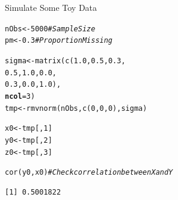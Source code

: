 \documentclass{beamer}\usepackage[]{graphicx}\usepackage[]{color}
\makeatletter
\newcommand{\hlnum}[1]{\textcolor[rgb]{0.69,0.494,0}{#1}}%
\newcommand{\hlcom}[1]{\textcolor[rgb]{0.514,0.506,0.514}{\textit{#1}}}%
\newcommand{\hlstd}[1]{\textcolor[rgb]{0,0,0}{#1}}%
\newcommand{\hlkwb}[1]{\textcolor[rgb]{0,0.341,0.682}{#1}}%
\newcommand{\hlkwc}[1]{\textcolor[rgb]{0,0,0}{\textbf{#1}}}%
\newcommand{\hlkwd}[1]{\textcolor[rgb]{0.004,0.004,0.506}{#1}}%
\newenvironment{kframe}{%
 \def\at@end@of@kframe{}%
 \ifinner\ifhmode%
  \def\at@end@of@kframe{\end{minipage}}%
  \begin{minipage}{\columnwidth}%
 \fi\fi%
 \def\FrameCommand##1{\hskip\@totalleftmargin \hskip-\fboxsep
 \colorbox{shadecolor}{##1}\hskip-\fboxsep
     \hskip-\linewidth \hskip-\@totalleftmargin \hskip\columnwidth}%
 \MakeFramed {\advance\hsize-\width
   \@totalleftmargin\z@ \linewidth\hsize
   \@setminipage}}%
 {\par\unskip\endMakeFramed%
 \at@end@of@kframe}
\newenvironment{knitrout}{}{} %
\makeatother
\begin{document}
\begin{frame}[fragile]{Simulate Some Toy Data}
  
\begin{knitrout}\footnotesize
{}\color{fgcolor}\begin{kframe}
\begin{alltt}
\hlstd{nObs} \hlkwb{<-} \hlnum{5000} \hlcom{# Sample Size}
\hlstd{pm}   \hlkwb{<-} \hlnum{0.3}  \hlcom{# Proportion Missing}

\hlstd{sigma} \hlkwb{<-} \hlkwd{matrix}\hlstd{(}\hlkwd{c}\hlstd{(}\hlnum{1.0}\hlstd{,} \hlnum{0.5}\hlstd{,} \hlnum{0.3}\hlstd{,}
                  \hlnum{0.5}\hlstd{,} \hlnum{1.0}\hlstd{,} \hlnum{0.0}\hlstd{,}
                  \hlnum{0.3}\hlstd{,} \hlnum{0.0}\hlstd{,} \hlnum{1.0}\hlstd{),}
                \hlkwc{ncol} \hlstd{=} \hlnum{3}\hlstd{)}
\hlstd{tmp} \hlkwb{<-} \hlkwd{rmvnorm}\hlstd{(nObs,} \hlkwd{c}\hlstd{(}\hlnum{0}\hlstd{,} \hlnum{0}\hlstd{,} \hlnum{0}\hlstd{), sigma)}

\hlstd{x0} \hlkwb{<-} \hlstd{tmp[ ,} \hlnum{1}\hlstd{]}
\hlstd{y0} \hlkwb{<-} \hlstd{tmp[ ,} \hlnum{2}\hlstd{]}
\hlstd{z0} \hlkwb{<-} \hlstd{tmp[ ,} \hlnum{3}\hlstd{]}

\hlkwd{cor}\hlstd{(y0, x0)} \hlcom{# Check correlation between X and Y}
\end{alltt}
\begin{verbatim}
[1] 0.5001822
\end{verbatim}
\end{kframe}
\end{knitrout}

\end{frame}

\end{document}
